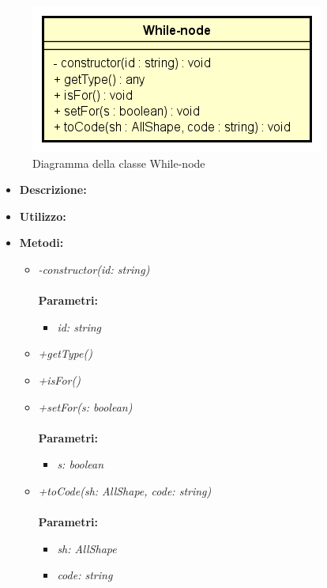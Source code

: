 \begin{figure}[h!]
	\centering
	\includegraphics[scale=0.8]{res/sections/SpecificaFrontEnd/Services/Disegnetti/while-node.png}
	\caption{Diagramma della classe While-node}
\end{figure}

\begin{itemize}
	\item \textbf{Descrizione:}\\
	
	\item \textbf{Utilizzo:}\\
	
	\item \textbf{Metodi:}
		\begin{itemize}
			\item \emph{-constructor(id: string)}\\
    		\\
    		\textbf{Parametri:}
    		\begin{itemize}
    			\item \emph{id: string}\\
    			
    		\end{itemize}
    		\item \emph{+getType()}\\
    		
    		\item \emph{+isFor()}\\
    		
    		\item \emph{+setFor(s: boolean)}\\
    		\\
    		\textbf{Parametri:}
    		\begin{itemize}
    			\item \emph{s: boolean}\\
    			
    		\end{itemize}
    		\item \emph{+toCode(sh: AllShape, code: string)}\\
    		\\
    		\textbf{Parametri:}
    		\begin{itemize}
    			\item \emph{sh: AllShape}\\
    			
    			\item \emph{code: string}\\
    			
    		\end{itemize}
    	\end{itemize}
\end{itemize}